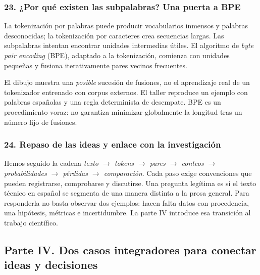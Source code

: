 \subsubsection*{23. ¿Por qué existen las subpalabras? Una puerta a BPE}
La tokenización por palabras puede producir vocabularios inmensos y palabras desconocidas; la tokenización por caracteres crea secuencias largas. Las subpalabras intentan encontrar unidades intermedias útiles. El algoritmo de \emph{byte pair encoding} (BPE), adaptado a la tokenización, comienza con unidades pequeñas y fusiona iterativamente pares vecinos frecuentes.
\begin{center}
\end{center}
El dibujo muestra una \emph{posible} sucesión de fusiones, no el aprendizaje real de un tokenizador entrenado con corpus externos. El taller reproduce un ejemplo con palabras españolas y una regla determinista de desempate. BPE es un procedimiento voraz: no garantiza minimizar globalmente la longitud tras un número fijo de fusiones.

\subsubsection*{24. Repaso de las ideas y enlace con la investigación}
Hemos seguido la cadena \emph{texto $\to$ tokens $\to$ pares $\to$ conteos $\to$ probabilidades $\to$ pérdidas $\to$ comparación}. Cada paso exige convenciones que pueden registrarse, comprobarse y discutirse. Una pregunta legítima es si el texto técnico en español se segmenta de una manera distinta a la prosa general. Para responderla no basta observar dos ejemplos: hacen falta datos con procedencia, una hipótesis, métricas e incertidumbre. La parte IV introduce esa transición al trabajo científico.
\clearpage



\subsection{Parte IV. Dos casos integradores para conectar ideas y decisiones}

